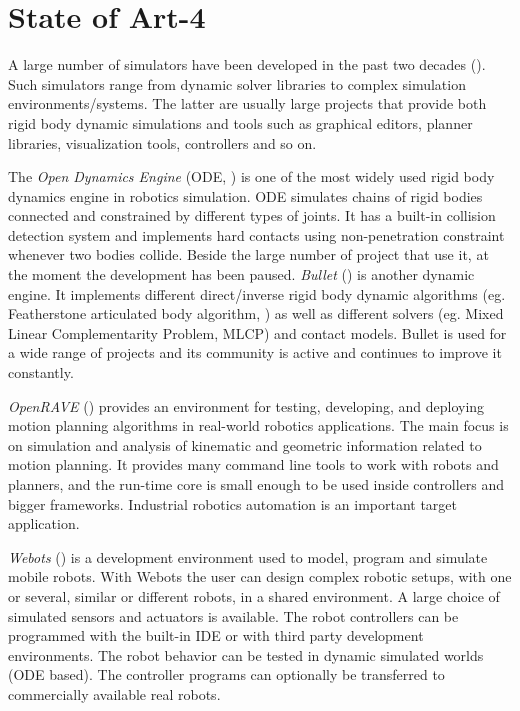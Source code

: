 \section{State of Art-4}\label{state_of_art4}
A large number of simulators  have been developed in the past two decades (\cite{DBLP:journals/corr/IvaldiPN14}). Such simulators range from dynamic solver libraries to complex simulation environments/systems. The latter are usually large projects that provide both rigid body dynamic simulations and tools such as graphical editors, planner libraries, visualization tools, controllers and so on.  

The \emph{Open Dynamics Engine} (ODE, \cite{ODE}) is one of the most widely used rigid body dynamics engine in robotics simulation. ODE simulates chains of rigid bodies connected and constrained by different types of joints. It has a built-in collision detection system and implements hard contacts using non-penetration constraint whenever two bodies collide. Beside the large number of project that use it, at the moment the development has been paused. \emph{Bullet} (\cite{BULLET}) is another dynamic engine. It implements different direct/inverse rigid body dynamic algorithms (eg. Featherstone articulated body algorithm, \cite{Featherstone:2007:RBD:1324846}) as well as different solvers (eg. Mixed Linear Complementarity Problem, MLCP) and contact models. Bullet is used for a wide range of projects and its community is active and continues to improve it constantly.

\emph{OpenRAVE} (\cite{diankovthesis}) provides an environment for testing, developing, and deploying motion planning algorithms in real-world robotics applications. The main focus is on simulation and analysis of kinematic and geometric information related to motion planning. It provides many command line tools to work with robots and planners, and the run-time core is small enough to be used inside controllers and bigger frameworks. Industrial robotics automation is an important target application. 

\emph{Webots}  (\cite{Michel04cyberboticsltd}) is a development environment used to model, program and simulate mobile robots. With Webots the user can design complex robotic setups, with one or several, similar or different robots, in a shared environment. A large choice of simulated sensors and actuators is available. The robot controllers can be programmed with the built-in IDE or with third party development environments. The robot behavior can be tested in dynamic simulated worlds (ODE based). The controller programs can optionally be transferred to commercially available real robots.

